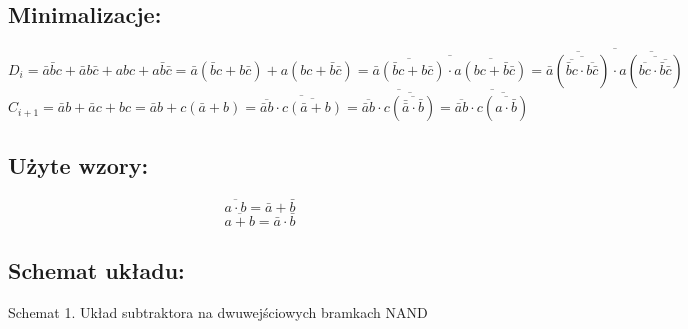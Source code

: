 \documentclass[12pt,a4paper]{article}
\begin{document}
		\subsection{Minimalizacje:}
			
			\begin{displaymath}
				D_i = \bar{a}\bar{b}c + \bar{a}b\bar{c} + abc + a\bar{b}\bar{c}
				= \bar{a}(\bar{b}c+b\bar{c}) + a(bc + \bar{b}\bar{c})
				= \overline{\overline{\bar{a}(\bar{b}c+b\bar{c})}\cdot\overline{a(bc + \bar{b}\bar{c})}}
				= \overline{\overline{\bar{a}(\overline{\overline{\bar{b}c}\cdot\overline{b\bar{c}}})}
					\cdot\overline{a(\overline{\overline{bc} \cdot \overline{\bar{b}\bar{c}}})}}
			\end{displaymath}
			\begin{displaymath}
				C_{i+1} = \bar{a}b+\bar{a}c+bc
				= \bar{a}b+c(\bar{a}+b)
				= \overline{\overline{\bar{a}b}\cdot\overline{c(\bar{a}+b)}}
				= \overline{\overline{\bar{a}b}\cdot\overline{c(\overline{\bar{\bar{a}}\cdot\bar{b}})}}
				= \overline{\overline{\bar{a}b}\cdot\overline{c(\overline{a\cdot\bar{b}})}}
			\end{displaymath}
		
		\subsection{Użyte wzory:}
			\begin{equation}
			\overline{a\cdot b}=\bar{a}+\bar{b}
			\end{equation}
			\begin{equation}
			\overline{a+b}=\bar{a}\cdot\bar{b}
			\end{equation}
			
		\subsection{Schemat układu:}
		
		\vspace{0.5cm}
		\begin{center}
			Schemat 1. Układ subtraktora na dwuwejściowych bramkach NAND
		\end{center}
\end{document}
